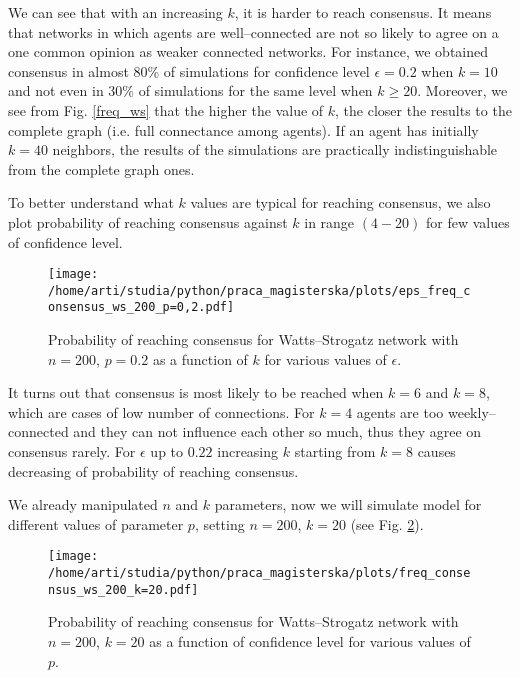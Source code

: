 \documentclass[a4paper, 12pt]{article}
\begin{document}
We can see that with an increasing $k$, it is harder to reach consensus. It means that networks in which agents are well--connected are not so likely to agree on a one common opinion as weaker connected networks. For instance, we obtained consensus in almost 80\% of simulations for confidence level $\epsilon=0.2$ when $k=10$ and not even in 30\% of simulations for the same level when $k\geq20$.
\indent
Moreover, we see from Fig. \ref{freq_ws} that the higher the value of $k$, the closer the results to the complete graph (i.e. full connectance among agents). If an agent has initially $k=40$ neighbors, the results of the simulations are practically indistinguishable from the complete graph ones.

\indent

To better understand what $k$ values are typical for reaching consensus, we also plot probability of reaching consensus against $k$ in range $(4-20)$ for few values of confidence level.

\begin{figure}[H]
		\centering
		\texttt{[image: /home/arti/studia/python/praca\_magisterska/plots/eps\_freq\_consensus\_ws\_200\_p=0,2.pdf]}
		\caption{Probability of reaching consensus for Watts--Strogatz network with $n=200$, $p=0.2$ as a function of $k$ for various values of $\epsilon$.}
		\label{freq_ws_eps}
\end{figure}

It turns out that consensus is most likely to be reached when $k=6$ and $k=8$, which are cases of low number of connections. For $k=4$ agents are too weekly--connected and they can not influence each other so much, thus they agree on consensus rarely. For $\epsilon$ up to $0.22$ increasing $k$ starting from $k=8$ causes decreasing of probability of reaching consensus.

\indent

We already manipulated $n$ and $k$ parameters, now we will simulate model for different values of parameter $p$, setting $n=200$, $k=20$ (see Fig. \ref{f12}).

\begin{figure}[H]
		\centering
		\texttt{[image: /home/arti/studia/python/praca\_magisterska/plots/freq\_consensus\_ws\_200\_k=20.pdf]}
		\caption{Probability of reaching consensus for Watts--Strogatz network with $n=200$, $k=20$ as a function of confidence level for various values of $p$.}
		\label{f12}
\end{figure}
\end{document}
